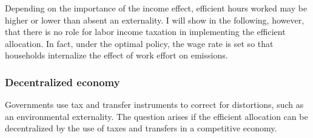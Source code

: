 Depending on the importance of the income effect, efficient hours worked may be higher or lower than  absent an externality. I will show in the following, however, that there is no role for labor income taxation in implementing the efficient allocation. In fact, under the optimal policy, the wage rate is set so that households internalize the effect of work effort on emissions. %


\subsubsection{Decentralized economy}\label{subsec:decen_ec}

Governments use tax and transfer instruments to correct for distortions, such as an environmental externality. The question arises if the efficient allocation can be decentralized by the use of taxes and transfers in a competitive economy.  %



